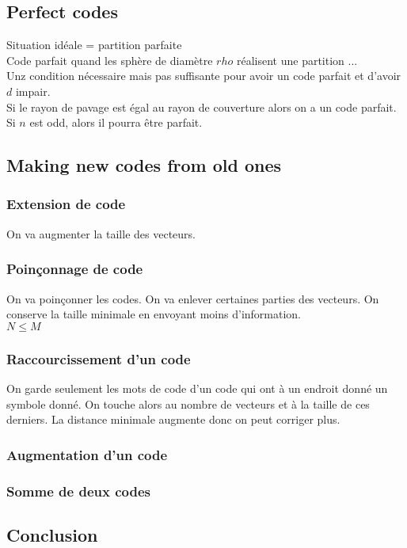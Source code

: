 \subsection{Perfect codes}
Situation idéale = partition parfaite\\
Code parfait quand les sphère de diamètre $rho$ réalisent une partition ...\\
Unz condition nécessaire mais pas suffisante pour avoir un code parfait et d'avoir $d$ impair.\\
Si le rayon de pavage est égal au rayon de couverture alors on a un code parfait.\\
Si $n$ est odd, alors il pourra être parfait.
\subsection{Making new codes from old ones}
\subsubsection{Extension de code}
On va augmenter la taille des vecteurs.
\subsubsection{Poinçonnage de code}
On va poinçonner les codes. On va enlever certaines parties des vecteurs. On conserve la taille minimale en envoyant moins d'information.\\
$N \leq M$
\subsubsection{Raccourcissement d'un code}
On garde seulement les mots de code d'un code qui ont à un endroit donné un symbole donné. On touche alors au nombre de vecteurs et à la taille de ces derniers. La distance minimale augmente donc on peut corriger plus.
\subsubsection{Augmentation d'un code}
\subsubsection{Somme de deux codes}
\subsection{Conclusion}
